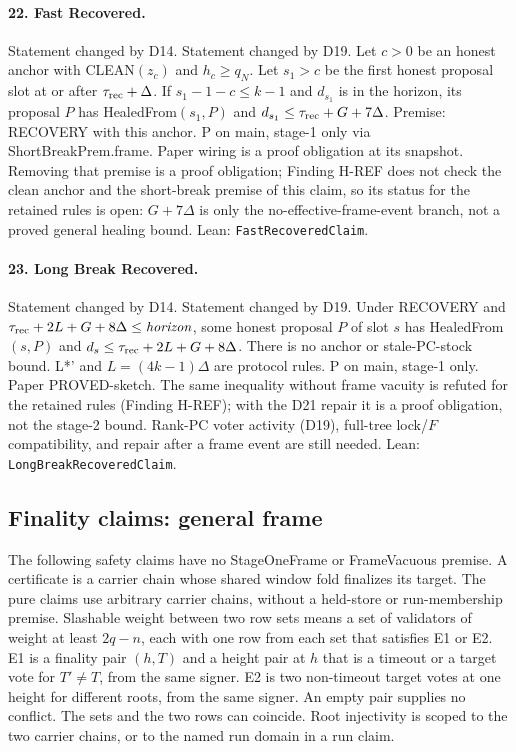 \documentclass{article}
\newcommand{\nm}[1]{\nolinkurl{#1}}
\begin{document}
\paragraph{22. Fast Recovered.}
Statement changed by D14. Statement changed by D19.
Let $c>0$ be an honest anchor with CLEAN$(z_c)$ and $h_c\geq q_N$. Let $s_1>c$ be the first honest proposal slot at or after $\tau_{\rm rec}+\Delta$. If $s_1-1-c\leq k-1$ and $d_{s_1}$ is in the horizon, its proposal $P$ has HealedFrom$(s_1,P)$ and $d_{s_1}\leq\tau_{\rm rec}+G+7\Delta$. Premise: RECOVERY with this anchor. P on main, stage-1 only via ShortBreakPrem.frame. Paper wiring is a proof obligation at its snapshot. Removing that premise is a proof obligation; Finding H-REF does not check the clean anchor and the short-break premise of this claim, so its status for the retained rules is open: $G+7\Delta$ is only the no-effective-frame-event branch, not a proved general healing bound.
Lean: \nm{FastRecoveredClaim}.

\paragraph{23. Long Break Recovered.}
Statement changed by D14. Statement changed by D19.
Under RECOVERY and $\tau_{\rm rec}+2L+G+8\Delta\leq\mathit{horizon}$, some honest proposal $P$ of slot $s$ has HealedFrom$(s,P)$ and $d_s\leq\tau_{\rm rec}+2L+G+8\Delta$. There is no anchor or stale-PC-stock bound. L*' and $L=(4k-1)\Delta$ are protocol rules. P on main, stage-1 only. Paper PROVED-sketch. The same inequality without frame vacuity is refuted for the retained rules (Finding H-REF); with the D21 repair it is a proof obligation, not the stage-2 bound. Rank-PC voter activity (D19), full-tree lock/$F$ compatibility, and repair after a frame event are still needed.
Lean: \nm{LongBreakRecoveredClaim}.

\subsection{Finality claims: general frame}

The following safety claims have no StageOneFrame or FrameVacuous premise.
A certificate is a carrier chain whose shared window fold finalizes
its target. The pure claims use arbitrary carrier chains, without a
held-store or run-membership premise. Slashable weight between two row
sets means a set of validators of weight at least $2q-n$, each with one
row from each set that satisfies E1 or E2. E1 is a finality pair $(h,T)$
and a height pair at $h$ that is a timeout or a target vote for $T'\ne T$,
from the same signer. E2 is two non-timeout target votes at one height
for different roots, from the same signer. An empty pair supplies no
conflict. The sets and the two rows can coincide.
Root injectivity is scoped
to the two carrier chains, or to the named run domain in a run claim.
\end{document}
